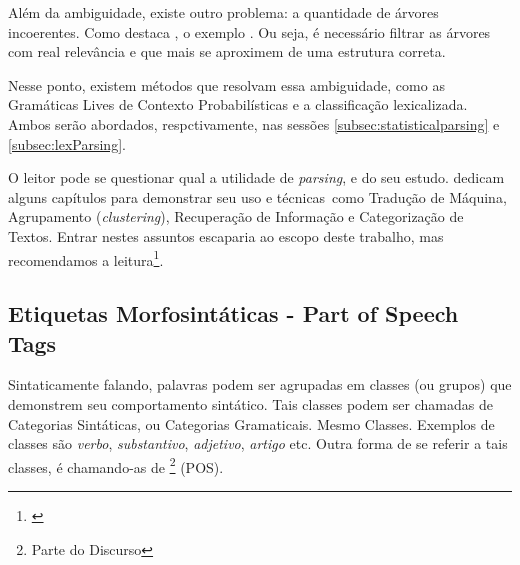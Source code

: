 Além da ambiguidade, existe outro problema: a quantidade de árvores incoerentes. Como destaca , o exemplo 
.
Ou seja, é necessário filtrar as árvores com real relevância e que mais se aproximem de uma estrutura correta.

Nesse ponto, existem métodos que resolvam essa ambiguidade, como as Gramáticas Lives de Contexto Probabilísticas e a classificação lexicalizada. Ambos serão abordados, respctivamente, nas sessões \ref{subsec:statisticalparsing} e \ref{subsec:lexParsing}.

O leitor pode se questionar qual a utilidade de \textit{parsing}, e do seu estudo.  dedicam alguns capítulos para demonstrar seu uso e técnicas\ como Tradução de Máquina, Agrupamento (\textit{clustering}), Recuperação de Informação e Categorização de Textos. Entrar nestes assuntos escaparia ao escopo deste trabalho, mas recomendamos a leitura\footnote{\cite[capítulos~13,14,15,16]{Manning1999FoundationsNLP}}.



\subsection{Etiquetas Morfosintáticas - Part of Speech Tags}
\label{subsec:POStags}

Sintaticamente falando, palavras podem ser agrupadas em classes (ou grupos) que demonstrem seu comportamento sintático. Tais classes podem ser chamadas de Categorias Sintáticas, ou Categorias Gramaticais. Mesmo Classes. Exemplos de classes são \textit{verbo}, \textit{substantivo}, \textit{adjetivo}, \textit{artigo} etc. Outra forma de se referir a tais classes, é chamando-as de \footnote{Parte do Discurso} (POS).

